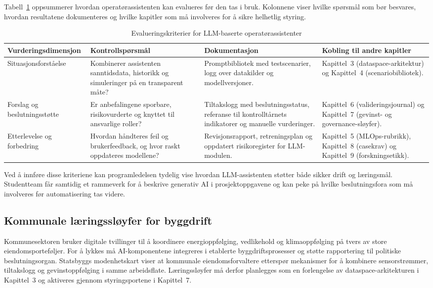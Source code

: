 Tabell~\ref{tab:llm-assistent-evaluering} oppsummerer hvordan operatørassistenten kan evalueres før den tas i bruk. Kolonnene viser hvilke spørsmål som bør besvares, hvordan resultatene dokumenteres og hvilke kapitler som må involveres for å sikre helhetlig styring.

\begin{table}[htbp]
    \centering
    \caption{Evalueringskriterier for LLM-baserte operatørassistenter}
    \label{tab:llm-assistent-evaluering}
    \begin{tabular}{p{3.6cm}p{4.5cm}p{4.0cm}p{3.8cm}}
        \toprule
        \textbf{Vurderingsdimensjon} & \textbf{Kontrollspørsmål} & \textbf{Dokumentasjon} & \textbf{Kobling til andre kapitler} \\
        \midrule
        Situasjonsforståelse & Kombinerer assistenten sanntidsdata, historikk og simuleringer på en transparent måte? & Promptbibliotek med testscenarier, logg over datakilder og modellversjoner. & Kapittel~3 (dataspace-arkitektur) og Kapittel~4 (scenariobibliotek). \\
        \addlinespace
        Forslag og beslutningsstøtte & Er anbefalingene sporbare, risikovurderte og knyttet til ansvarlige roller? & Tiltakslogg med beslutningsstatus, referanse til kontrolltårnets indikatorer og manuelle vurderinger. & Kapittel~6 (valideringsjournal) og Kapittel~7 (gevinst- og governance-sløyfer). \\
        \addlinespace
        Etterlevelse og forbedring & Hvordan håndteres feil og brukerfeedback, og hvor raskt oppdateres modellene? & Revisjonsrapport, retreningsplan og oppdatert risikoregister for LLM-modulen. & Kapittel~5 (MLOps-rubrikk), Kapittel~8 (casekrav) og Kapittel~9 (forskningsetikk). \\
        \bottomrule
    \end{tabular}
\end{table}

Ved å innføre disse kriteriene kan programledelsen tydelig vise hvordan LLM-assistenten støtter både sikker drift og læringsmål. Studentteam får samtidig et rammeverk for å beskrive generativ AI i prosjektoppgavene og kan peke på hvilke beslutningsfora som må involveres før automatisering tas videre.

\subsection{Kommunale læringssløyfer for byggdrift}
Kommunesektoren bruker digitale tvillinger til å koordinere energioppfølging, vedlikehold og klimaoppfølging på tvers av store eiendomsporteføljer.\citep{ks2024eiendomsdrift} For å lykkes må AI-komponentene integreres i etablerte byggdriftsprosesser og støtte rapportering til politiske beslutningsorgan. Statsbyggs modenhetskart viser at kommunale eiendomsforvaltere etterspør mekanismer for å kombinere sensorstrømmer, tiltakslogg og gevinstoppfølging i samme arbeidsflate.\citep{statsbygg2023digitalmodenhet} Læringssløyfer må derfor planlegges som en forlengelse av dataspace-arkitekturen i Kapittel~3 og aktiveres gjennom styringsportene i Kapittel~7.

